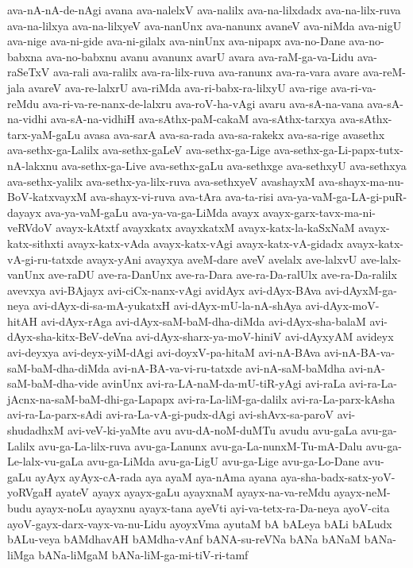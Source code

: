 {ava-nA-nA-de-nAgi
avana
ava-nalelxV
ava-nalilx
ava-na-lilxdadx
ava-na-lilx-ruva
ava-na-lilxya
ava-na-lilxyeV
ava-nanUnx
ava-nanunx
avaneV
ava-niMda
ava-nigU
ava-nige
ava-ni-gide
ava-ni-gilalx
ava-ninUnx
ava-nipapx
ava-no-Dane
ava-no-babxna
ava-no-babxnu
avanu
avanunx
avarU
avara
ava-raM-ga-va-Lidu
ava-raSeTxV
ava-rali
ava-ralilx
ava-ra-lilx-ruva
ava-ranunx
ava-ra-vara
avare
ava-reM-jala
avareV
ava-re-lalxrU
ava-riMda
ava-ri-babx-ra-lilxyU
ava-rige
ava-ri-va-reMdu
ava-ri-va-re-nanx-de-lalxru
ava-roV-ha-vAgi
avaru
ava-sA-na-vana
ava-sA-na-vidhi
ava-sA-na-vidhiH
ava-sAthx-paM-cakaM
ava-sAthx-tarxya
ava-sAthx-tarx-yaM-gaLu
avasa
ava-sarA
ava-sa-rada
ava-sa-rakekx
ava-sa-rige
avasethx
ava-sethx-ga-Lalilx
ava-sethx-gaLeV
ava-sethx-ga-Lige
ava-sethx-ga-Li-papx-tutx-nA-lakxnu
ava-sethx-ga-Live
ava-sethx-gaLu
ava-sethxge
ava-sethxyU
ava-sethxya
ava-sethx-yalilx
ava-sethx-ya-lilx-ruva
ava-sethxyeV
avashayxM
ava-shayx-ma-nu-BoV-katxvayxM
ava-shayx-vi-ruva
ava-tAra
ava-ta-risi
ava-ya-vaM-ga-LA-gi-puR-dayayx
ava-ya-vaM-gaLu
ava-ya-va-ga-LiMda
avayx
avayx-garx-tavx-ma-ni-veRVdoV
avayx-kAtxtf
avayxkatx
avayxkatxM
avayx-katx-la-kaSxNaM
avayx-katx-sithxti
avayx-katx-vAda
avayx-katx-vAgi
avayx-katx-vA-gidadx
avayx-katx-vA-gi-ru-tatxde
avayx-yAni
avayxya
aveM-dare
aveV
avelalx
ave-lalxvU
ave-lalx-vanUnx
ave-raDU
ave-ra-DanUnx
ave-ra-Dara
ave-ra-Da-ralUlx
ave-ra-Da-ralilx
avevxya
avi-BAjayx
avi-ciCx-nanx-vAgi
avidAyx
avi-dAyx-BAva
avi-dAyxM-ga-neya
avi-dAyx-di-sa-mA-yukatxH
avi-dAyx-mU-la-nA-shAya
avi-dAyx-moV-hitAH
avi-dAyx-rAga
avi-dAyx-saM-baM-dha-diMda
avi-dAyx-sha-balaM
avi-dAyx-sha-kitx-BeV-deVna
avi-dAyx-sharx-ya-moV-hiniV
avi-dAyxyAM
avideyx
avi-deyxya
avi-deyx-yiM-dAgi
avi-doyxV-pa-hitaM
avi-nA-BAva
avi-nA-BA-va-saM-baM-dha-diMda
avi-nA-BA-va-vi-ru-tatxde
avi-nA-saM-baMdha
avi-nA-saM-baM-dha-vide
avinUnx
avi-ra-LA-naM-da-mU-tiR-yAgi
avi-raLa
avi-ra-La-jAcnx-na-saM-baM-dhi-ga-Lapapx
avi-ra-La-liM-ga-dalilx
avi-ra-La-parx-kAsha
avi-ra-La-parx-sAdi
avi-ra-La-vA-gi-pudx-dAgi
avi-shAvx-sa-paroV
avi-shudadhxM
avi-veV-ki-yaMte
avu
avu-dA-noM-duMTu
avudu
avu-gaLa
avu-ga-Lalilx
avu-ga-La-lilx-ruva
avu-ga-Lanunx
avu-ga-La-nunxM-Tu-mA-Dalu
avu-ga-Le-lalx-vu-gaLa
avu-ga-LiMda
avu-ga-LigU
avu-ga-Lige
avu-ga-Lo-Dane
avu-gaLu
ayAyx
ayAyx-cA-rada
aya
ayaM
aya-nAma
ayana
aya-sha-badx-satx-yoV-yoRVgaH
ayateV
ayayx
ayayx-gaLu
ayayxnaM
ayayx-na-va-reMdu
ayayx-neM-budu
ayayx-noLu
ayayxnu
ayayx-tana
ayeVti
ayi-va-tetx-ra-Da-neya
ayoV-cita
ayoV-gayx-darx-vayx-va-nu-Lidu
ayoyxVma
ayutaM
bA
bALeya
bALi
bALudx
bALu-veya
bAMdhavAH
bAMdha-vAnf
bANA-su-reVNa
bANa
bANaM
bANa-liMga
bANa-liMgaM
bANa-liM-ga-mi-tiV-ri-tamf
}
